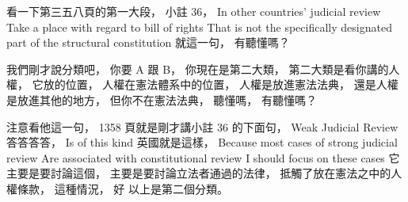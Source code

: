 \hypertarget{w06:cue:1070}{}看一下第三五八頁的第一大段，
\hypertarget{w06:cue:1071}{}小註 36，
\hypertarget{w06:cue:1072}{}In other countries' judicial review
\hypertarget{w06:cue:1073}{}Take a place with regard to bill of rights
\hypertarget{w06:cue:1074}{}That is not the specifically designated part of the structural constitution
\hypertarget{w06:cue:1075}{}就這一句，
\hypertarget{w06:cue:1076}{}有聽懂嗎？

\hypertarget{w06:cue:1077}{}我們剛才說分類吧，
\hypertarget{w06:cue:1078}{}你要 A 跟 B，
\hypertarget{w06:cue:1079}{}你現在是第二大類，
\hypertarget{w06:cue:1080}{}第二大類是看你講的人權，
\hypertarget{w06:cue:1081}{}它放的位置，
\hypertarget{w06:cue:1082}{}人權在憲法體系中的位置，
\hypertarget{w06:cue:1083}{}人權是放進憲法法典，
\hypertarget{w06:cue:1084}{}還是人權是放進其他的地方，
\hypertarget{w06:cue:1085}{}但你不在憲法法典，
\hypertarget{w06:cue:1086}{}聽懂嗎，
\hypertarget{w06:cue:1087}{}有聽懂嗎？

\hypertarget{w06:cue:1088}{}注意看他這一句，
\hypertarget{w06:cue:1089}{}1358 頁就是剛才講小註 36 的下面句，
\hypertarget{w06:cue:1090}{}Weak Judicial Review 答答答答，
\hypertarget{w06:cue:1091}{}Is of this kind
\hypertarget{w06:cue:1092}{}英國就是這樣，
\hypertarget{w06:cue:1093}{}Because most cases of strong judicial review
\hypertarget{w06:cue:1094}{}Are associated with constitutional review
\hypertarget{w06:cue:1095}{}I should focus on these cases
\hypertarget{w06:cue:1096}{}它主要是要討論這個，
\hypertarget{w06:cue:1097}{}主要是要討論立法者通過的法律，
\hypertarget{w06:cue:1098}{}抵觸了放在憲法之中的人權條款，
\hypertarget{w06:cue:1099}{}這種情況，
\hypertarget{w06:cue:1100}{}好 以上是第二個分類。


